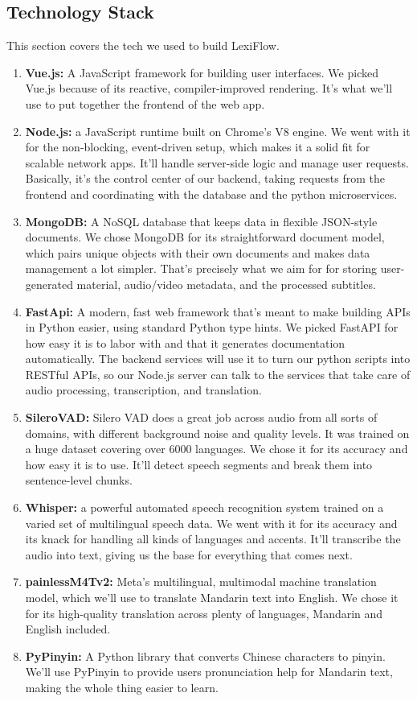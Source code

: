 \begin{enumerate}[label= (\alph*)]
\begin{enumerate}[label= (\roman*)]
\section{Technology Stack}This section covers the tech we used to build LexiFlow.
\begin{enumerate}[label= (\alph*)] \item \textbf{Vue.js:} A JavaScript framework for building user interfaces. We picked Vue.js because of its reactive, compiler-improved rendering. It's what we'll use to put together the frontend of the web app. \item \textbf{Node.js:} a JavaScript runtime built on Chrome's V8 engine. We went with it for the non-blocking, event-driven setup, which makes it a solid fit for scalable network apps. It'll handle server-side logic and manage user requests. Basically, it's the control center of our backend, taking requests from the frontend and coordinating with the database and the python microservices. \item \textbf{MongoDB:} A NoSQL database that keeps data in flexible JSON-style documents. We chose MongoDB for its straightforward document model, which pairs unique objects with their own documents and makes data management a lot simpler. That's precisely what we aim for for storing user-generated material, audio/video metadata, and the processed subtitles. \item \textbf{FastApi:} A modern, fast web framework that's meant to make building APIs in Python easier, using standard Python type hints. We picked FastAPI for how easy it is to labor with and that it generates documentation automatically. The backend services will use it to turn our python scripts into RESTful APIs, so our Node.js server can talk to the services that take care of audio processing, transcription, and translation. \item \textbf{SileroVAD:} Silero VAD does a great job across audio from all sorts of domains, with different background noise and quality levels. It was trained on a huge dataset covering over 6000 languages. We chose it for its accuracy and how easy it is to use. It'll detect speech segments and break them into sentence-level chunks. \item \textbf{Whisper:} a powerful automated speech recognition system trained on a varied set of multilingual speech data. We went with it for its accuracy and its knack for handling all kinds of languages and accents. It'll transcribe the audio into text, giving us the base for everything that comes next. \item \textbf{painlessM4Tv2:} Meta's multilingual, multimodal machine translation model, which we'll use to translate Mandarin text into English. We chose it for its high-quality translation across plenty of languages, Mandarin and English included. \item \textbf{PyPinyin:} A Python library that converts Chinese characters to pinyin. We'll use PyPinyin to provide users pronunciation help for Mandarin text, making the whole thing easier to learn.

\end{enumerate}
\end{enumerate}
\end{enumerate}
